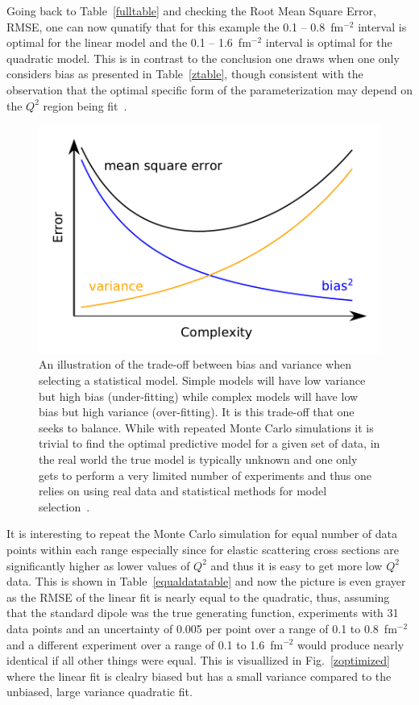\documentclass[10pt,aps,prc,twocolumn]{revtex4-1}
\begin{document}
Going back to Table~\ref{fulltable} and checking the Root Mean Square Error, RMSE, one can now qunatify 
that for this example the 0.1 -- 0.8~fm$^{-2}$ interval is optimal for the linear model and the 0.1 -- 1.6~fm$^{-2}$ 
interval is optimal for the quadratic model. 
This is in contrast to the conclusion one draws when one only considers bias as presented in Table~\ref{ztable},
though consistent with the observation that the optimal specific form of the parameterization 
may depend on the $Q^2$ region being fit~\cite{Alberico:2008sz}.
\begin{figure}
\label{biasvariance}
\includegraphics[width=\columnwidth]{Figure/biasvariance-clean.pdf}
\caption{An illustration of the trade-off between bias and variance when selecting a statistical model.   Simple models
will have low variance but high bias (under-fitting) while complex models will have low bias but high variance (over-fitting).   
It is this trade-off that one seeks to balance.   While with repeated  Monte Carlo simulations it is trivial to find the optimal
predictive model for a given set of data, in the real world the true model is typically unknown and one only gets to perform
a very limited number of experiments and thus one relies on using real data and statistical methods for 
model selection~\cite{Hastie:2009}.}
\end{figure}

It is interesting to repeat the Monte Carlo simulation for equal number of data points within each range
especially since for elastic scattering cross sections are significantly higher as lower values of $Q^2$
and thus it is easy to get more low $Q^2$ data.
This is shown in Table~\ref{equaldatatable} and now the picture is even grayer as the RMSE of the linear 
fit is nearly equal to the quadratic, thus, assuming that the standard dipole was the true generating function,  experiments
with 31 data points and an uncertainty of 0.005 per point over a range of 0.1 to 0.8~fm$^{-2}$ and a different experiment
over a range of 0.1 to 1.6~fm$^{-2}$ would produce nearly identical if all other things were equal.
This is visuallized in Fig.~\ref{zoptimized} where the linear fit is clealry biased but has a small variance compared to
the unbiased, large variance quadratic fit.
\end{document}
